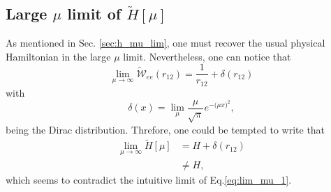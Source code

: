 \documentclass[aip,jcp,reprint,noshowkeys,superscriptaddress]{revtex4-1}
\begin{document}
\subsection{Large $\mu$ limit of $\tilde{H}[\mu]$}
\label{sec:large_mu_lim}
As mentioned in Sec. \ref{sec:h_mu_lim}, one must recover the usual physical Hamiltonian in the large $\mu$ limit. 
Nevertheless, one can notice that 
\begin{equation}
 \label{eq:lim_mu_3}
 \lim_{\mu \rightarrow \infty} \tilde{\mathcal{W}}_{ee}(r_{12})  = \frac{1}{r_{12}} + \delta(r_{12}) 
\end{equation}
with 
\begin{equation}
 \delta(x) = \lim_{\mu} \frac{\mu}{\sqrt{\pi}} e^{-\big(\mu x \big)^2}, 
\end{equation}
being the Dirac distribution. Threfore, one could be tempted to write that 
\begin{equation}
 \begin{aligned}
 \label{eq:lim_mu_4}
 \lim_{\mu \rightarrow \infty} \tilde{H}[\mu]& = H + \delta(r_{12})  \\
                                             & \ne H,
 \end{aligned}
\end{equation}
which seems to contradict the intuitive limit of Eq.\eqref{eq:lim_mu_1}. 
\end{document}
